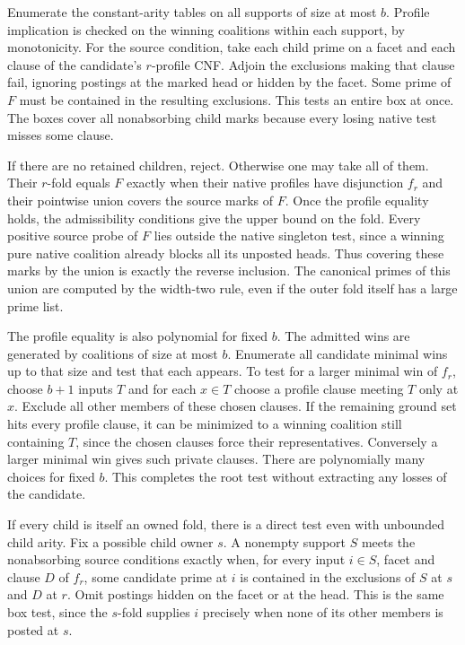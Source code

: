 Enumerate the constant-arity tables on all supports of size
at most $b$. Profile implication is checked on the winning
coalitions within each support, by monotonicity. For the
source condition, take each child prime on a facet and each
clause of the candidate's $r$-profile CNF. Adjoin the
exclusions making that clause fail, ignoring postings at the
marked head or hidden by the facet. Some prime of $F$ must
be contained in the resulting exclusions. This tests an
entire box at once. The boxes cover all nonabsorbing child
marks because every losing native test misses some clause.

If there are no retained children, reject. Otherwise one may
take all of them. Their $r$-fold
equals $F$ exactly when their native profiles have disjunction
$f_r$ and their pointwise union covers the source marks of
$F$. Once the profile equality holds, the admissibility
conditions give the upper bound on the fold. Every positive
source probe of $F$ lies outside the native singleton test,
since a winning pure native coalition already blocks all its
unposted heads. Thus covering these marks by the union is
exactly the reverse inclusion. The canonical primes of this
union are computed by the width-two rule, even if the outer
fold itself has a large prime list.

The profile equality is also polynomial for fixed $b$.
The admitted wins are generated by coalitions of size at most
$b$. Enumerate all candidate minimal wins up to that size and
test that each appears. To test for a larger minimal win of
$f_r$, choose $b+1$ inputs $T$ and for each $x\in T$ choose a
profile clause meeting $T$ only at $x$. Exclude all other
members of these chosen clauses. If the remaining ground set
hits every profile clause, it can be minimized to a winning
coalition still containing $T$, since the chosen clauses force
their representatives. Conversely a larger minimal win gives
such private clauses. There are polynomially many choices for
fixed $b$. This completes the root test without extracting
any losses of the candidate.

If every child is itself an owned fold, there is a direct
test even with unbounded child arity. Fix a possible child
owner $s$. A nonempty support $S$ meets the nonabsorbing
source conditions exactly when, for every input $i\in S$,
facet and clause $D$ of $f_r$, some candidate prime at $i$
is contained in the exclusions of $S$ at $s$ and $D$ at $r$.
Omit postings hidden on the facet or at the head. This is the
same box test, since the $s$-fold supplies $i$ precisely when
none of its other members is posted at $s$.

